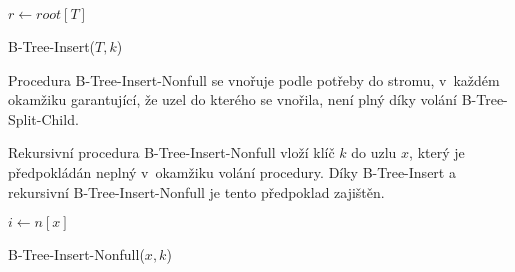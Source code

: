 \begin{algorithm}[t]
\SetAlgoLined
{}

$r\longleftarrow root[T]$

\caption{B-Tree-Insert($T,k$)}
\end{algorithm}

Procedura B-Tree-Insert-Nonfull se vnořuje podle potřeby do stromu,
v~každém okamžiku garantující, že uzel do kterého se vnořila, není
plný díky volání B-Tree-Split-Child\@.

Rekursivní procedura B-Tree-Insert-Nonfull vloží klíč $k$ do uzlu
$x$, který je předpokládán neplný v~okamžiku volání procedury\@.
Díky B-Tree-Insert a rekursivní B-Tree-Insert-Nonfull je tento předpoklad
zajištěn\@.

\begin{algorithm}[t]
\SetAlgoLined
{}

$i \longleftarrow n[x]$\\

\caption{B-Tree-Insert-Nonfull($x,k$)}
\end{algorithm}

